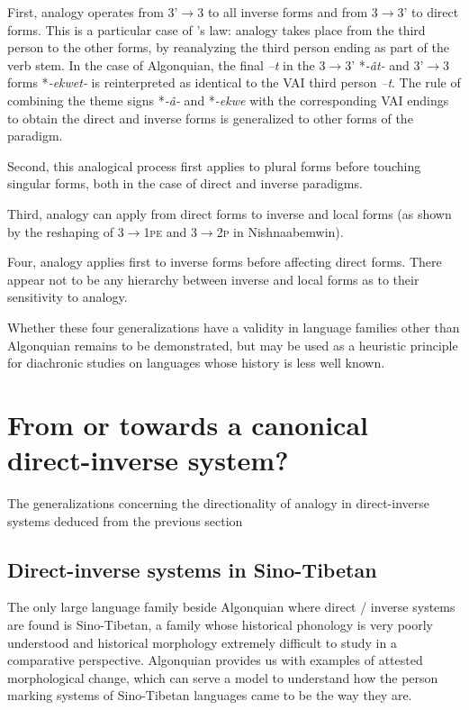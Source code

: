 \documentclass[twoside,a4paper,11pt]{article}
\newcommand{\ipa}[1]{{\phon\textit{#1}}}
\newcommand{\Σ}{\greek{Σ}}
\begin{document}
First, analogy operates from 3'$\rightarrow$3 to all inverse forms and from 3$\rightarrow$3' to direct forms. This is a particular case of   \citealt{watkins62celtic}'s law: analogy takes place from the third person to the other forms, by reanalyzing the third person ending as part of the verb stem. In the case of Algonquian, the final  \ipa{--t}  in the 3$\rightarrow$3' *\ipa{-ât-} and 3'$\rightarrow$3 forms *\ipa{-ekwet-} is reinterpreted as identical to the VAI third person \ipa{--t}.  The rule of combining the  theme signs *\ipa{-â-} and *\ipa{-ekwe}   with the corresponding VAI endings to obtain the direct and inverse forms  is generalized to other forms of the paradigm.

Second, this analogical process first applies to plural forms before touching singular forms, both in the case of direct and inverse paradigms.
 
Third, analogy can apply from direct forms to inverse and  local forms (as shown by the reshaping of \textsc{3$\rightarrow$1pe} and \textsc{3$\rightarrow$2p} in Nishnaabemwin).

Four, analogy applies first to inverse forms before affecting direct forms. There appear not to be any hierarchy between inverse and local forms as to their sensitivity to analogy.
 
 
 Whether these four generalizations have a validity in language families other than Algonquian remains to be demonstrated, but may be used as a heuristic principle for diachronic studies on languages whose history is less well known.  
 
\section{From or towards a canonical direct-inverse system?}

The generalizations concerning the directionality of analogy in direct-inverse systems deduced from the previous section 


\subsection{Direct-inverse systems in Sino-Tibetan}

The only   large language family beside Algonquian where direct / inverse systems are found is Sino-Tibetan, a family whose historical phonology is very poorly understood and historical morphology extremely difficult to study in a comparative perspective. Algonquian provides us with examples of attested morphological change, which can serve a model to understand how the person marking systems of Sino-Tibetan languages came to be the way they are.
\end{document}
